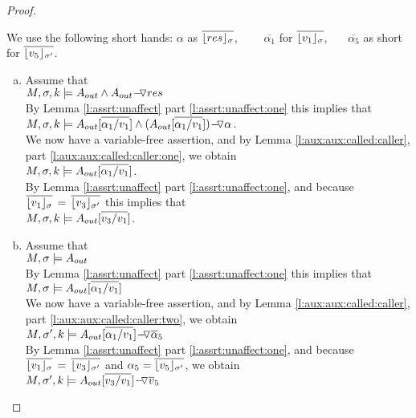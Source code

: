 \begin{proof}$ ~ $



We use the following short hands: $\alpha$ as   $\overline {\interpret {\sigma} {res}}$, 
\ \ \ \ 
$\overline {\alpha_1}$   for $\overline {\interpret {\sigma} {v_1}}$, \ \ \ 
$\overline {\alpha_5}$ as short for $\overline {\interpret {\sigma'} {v_5}}$.

\newcommand{\substOne}{[\overline{\alpha_1/v_1}]}
\newcommand{\substFive}{[\overline{\alpha_5/v_5}]}

\begin{enumerate}[a.]
\item
Assume that \\
$\satDAssertFrom M  \sigma k   {\Aout  \wedge  {\PushASLong  {res} {\Aout} } } $\\
	By Lemma \ref{l:assrt:unaffect} part \ref{l:assrt:unaffect:one} this  implies that \\
$ \satDAssertFrom M  \sigma k   {\Aout\substOne  \wedge  {\PushASLong  {\alpha} {(\Aout\substOne)} } }$.\\
We now have a variable-free assertion,
and by Lemma \ref{l:aux:aux:called:caller}, part \ref{l:aux:aux:called:caller:one}, we obtain\\
$ \satDAssertFrom M  \sigma k   {\Aout\substOne} $.\\
By Lemma \ref{l:assrt:unaffect} part \ref{l:assrt:unaffect:one}, and because $ \overline {\interpret {\sigma} {v_1} }\, =\,  \overline {\interpret {\sigma'}  {v_3} }$  this  implies that \\
$ \satDAssertFrom M  \sigma k   {\Aout[\overline { v_3/v_1}] } $.
\item
Assume that \\
$M,  \sigma\models \Aout  $\\
By Lemma \ref{l:assrt:unaffect} part \ref{l:assrt:unaffect:one} this  implies that \\
$M,  \sigma\models \Aout\substOne$\\
We now have a variable-free assertion,
and by Lemma \ref{l:aux:aux:called:caller}, part \ref{l:aux:aux:called:caller:two}, we obtain\\
$ \satDAssertFrom M  {\sigma'} k    {\PushASLong {\overline \alpha_5} {\Aout\substOne}}$\\
By Lemma \ref{l:assrt:unaffect} part \ref{l:assrt:unaffect:one}, and because $ \overline {\interpret {\sigma} {v_1} }\, =\,  \overline {\interpret {\sigma'}  {v_3} }$  and $\alpha_5 = \overline {\interpret {\sigma'} {v_5}}$, we obtain \\
$ \satDAssertFrom M  {\sigma'} k    {\PushASLong {\overline v_5} {\Aout[\overline {v_3/v_1}]}}$
\end{enumerate}

\end{proof}



